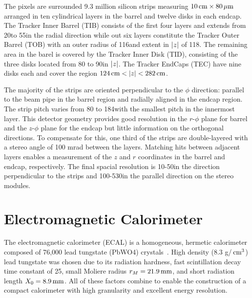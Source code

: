 The pixels are surrounded 9.3 million silicon strips measuring $10\,\text{cm}\times 80\,\mu\text{m}$ arranged in ten cylindrical layers in the barrel and twelve disks in each endcap.
The Tracker Inner Barrel (TIB) consists of the first four layers and extends from 20\cm to 55\cm in the radial direction while out six layers constitute the Tracker Outer Barrel (TOB) with an outer radius of 116\cm and extent in $\lvert z \rvert$ of 118\cm.
The remaining area in the barel is covered by the Tracker Inner Disk (TID), consisting of the three disks located from 80 to 90\cm in $\lvert z \rvert$.
The Tracker EndCaps (TEC) have nine disks each and cover the region $124\,\text{cm} < \lvert z \rvert < 282\,\text{cm}$.

The majority of the strips are oriented perpendicular to the $\phi$ direction: parallel to the beam pipe in the barrel region and radially aligned in the endcap region.
The strip pitch varies from 80 to 184\mum with the smallest pitch in the innermost layer.
This detector geometry provides good resolution in the $r$-$\phi$ plane for barrel and the $z$-$\phi$ plane for the endcap but little information on the orthogonal directions.
To compensate for this, one third of the strips are double-layered with a stereo angle of 100 mrad between the layers.
Matching hits between adjacent layers enables a measurement of the $z$ and $r$ coordinates in the barrel and endcap, respectively.
The final spacial resolution is 10-50\mum in the direction perpendicular to the strips and 100-530\mum in the parallel direction on the stereo modules.

\section{Electromagnetic Calorimeter}

The electromagnetic calorimeter (ECAL) is a homogeneous, hermetic calorimeter composed of 76,000 lead tungstate (PbWO4) crystals~\cite{CMS2008}.
High density (8.3 g/$\,\text{cm}^3$) lead tungstate was chosen due to its radiation hardness, fast scintillation decay time constant of 25\ns, small Moliere radius $r_M= 21.9\,\text{mm}$, and short radiation length $X_0 = 8.9\,\text{mm}$.
All of these factors combine to enable the construction of a compact calorimeter with high granularity and excellent energy resolution.

